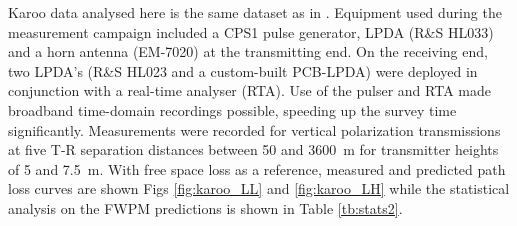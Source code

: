 \documentclass[10pt,journal,twoside]{IEEEtran}
\begin{document}
Karoo data analysed here is the same dataset as in \cite{Phiri}. Equipment used during the measurement campaign included a CPS1 pulse generator, LPDA (R\&S HL033) and a horn antenna (EM-7020) at the transmitting end. On the receiving end, two LPDA's (R\&S HL023 and a custom-built PCB-LPDA) were deployed in conjunction with a real-time analyser (RTA). Use of the pulser and RTA made broadband time-domain recordings possible, speeding up the survey time significantly. Measurements were recorded for vertical polarization transmissions at five T-R separation distances between \SI{50}{} and \SI{3600}{m} for transmitter heights of \SI{5}{} and \SI{7.5}{m}. With free space loss as a reference, measured and predicted path loss curves are shown Figs \ref{fig:karoo_LL} and \ref{fig:karoo_LH} while the statistical analysis on the FWPM predictions is shown in Table \ref{tb:stats2}. %
%
\end{document}
